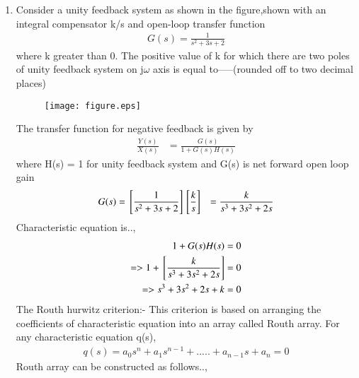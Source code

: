 \begin{enumerate}[label=\thesection.\arabic*.,ref=\thesection.\theenumi]

\item
Consider a unity feedback system as shown in the figure,shown with an integral compensator k/s and open-loop transfer function
\begin{align}
G(s) = \frac{1}{s^2+3s+2}
\end{align}
where k greater than 0. The positive value of k for which there are two poles of unity feedback system on j${\omega}$ axis is equal to-----(rounded off to two decimal places)
\begin{figure}
\centering
\texttt{[image: figure.eps]}
\end{figure}
\solution The transfer function for negative feedback is given by
\begin{align}
\frac{Y(s)}{X(s)} &= \frac{G(s)}{1+G(s)H(s)}
\end{align}
where H(s) = 1 for unity feedback system
and G(s) is net forward open loop gain
\begin{align}
G(s) &=  {}\left[\frac{1}{s^2+3s+2}\right]{}\left[\frac{k}{s}\right]
&= \frac{k}{s^3+3s^2+2s}
\end{align}
Characteristic equation is..,
\begin{align}
 1 + G(s)H(s) = 0 \label{eq:sec_order_op}
\\
=> 1 + {}\left[\frac{k}{s^3+3s^2+2s}\right] = 0
\\
=> s^3+3s^2+2s+k = 0
\end{align}
The Routh hurwitz criterion:-
This criterion is based on arranging the coefficients of characteristic equation into an array called Routh array.
For any characteristic equation q(s),
\begin{multline}
q(s) = a_0s^n+a_1s^{n-1}+.....+a_{n-1}s+a_n = 0
\end{multline}
Routh array can be constructed as follows..,
 

\end{enumerate}
